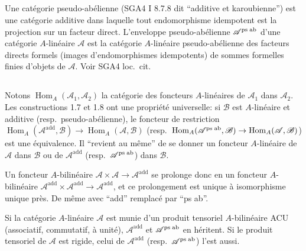 \documentclass[11pt,a4paper]{article}
\theoremstyle{plain}
\theoremstyle{definition}
\DeclareMathOperator{\Hom}{Hom}
\begin{document}
\subsection{}
Une cat\'egorie pseudo-ab\'elienne (SGA4 I 8.7.8 dit ``additive et karoubienne'') est une cat\'egorie additive dans laquelle tout endomorphisme idempotent est la projection sur un facteur direct. L'enveloppe pseudo-ab\'elienne $\mathcal{A}^{\text{ps\;ab}}$ d'une cat\'egorie $A$-lin\'eaire $\mathcal{A}$ est la cat\'egorie $A$-lin\'eaire pseudo-ab\'elienne des facteurs directs formels (images d'endomorphismes idempotents) de sommes formelles finies d'objets de $\mathcal{A}$. Voir SGA4 loc.~cit.

\subsection{}
Notons $\Hom_A(\mathcal{A}_1, \mathcal{A}_2)$ la cat\'egorie des foncteurs $A$-lin\'eaires de $\mathcal{A}_1$ dans $\mathcal{A}_2$. Les constructions 1.7 et 1.8 ont une propri\'et\'e universelle: si $\mathcal{B}$ est $A$-lin\'eaire et additive (resp.~pseudo-ab\'elienne), le foncteur de restriction $\Hom_A(\mathcal{A}^{\text{add}}, \mathcal{B}) \to \Hom_A(\mathcal{A}, \mathcal{B})$ (resp.~$\Hom_A(\mathcal{A}^{\text{ps\;ab}}, \mathcal{B}) \to \Hom_A(\mathcal{A}, \mathcal{B})$) est une \'equivalence. Il ``revient au m\^eme'' de se donner un foncteur $A$-lin\'eaire de $\mathcal{A}$ dans $\mathcal{B}$ ou de $\mathcal{A}^{\text{add}}$ (resp.~$\mathcal{A}^{\text{ps\;ab}}$) dans $\mathcal{B}$.

Un foncteur $A$-bilin\'eaire $\mathcal{A} \times \mathcal{A} \to \mathcal{A}^{\text{add}}$ se prolonge donc en un foncteur $A$-bilin\'eaire $\mathcal{A}^{\text{add}} \times \mathcal{A}^{\text{add}} \to \mathcal{A}^{\text{add}}$, et ce prolongement est unique \`a isomorphisme unique pr\`es. De m\^eme avec ``add'' remplac\'e par ``ps ab''.

Si la cat\'egorie $A$-lin\'eaire $\mathcal{A}$ est munie d'un produit tensoriel $A$-bilin\'eaire ACU (associatif, commutatif, \`a unit\'e), $\mathcal{A}^{\text{add}}$ et $\mathcal{A}^{\text{ps\;ab}}$ en h\'eritent. Si le produit tensoriel de $\mathcal{A}$ est rigide, celui de $\mathcal{A}^{\text{add}}$ (resp.~$\mathcal{A}^{\text{ps\;ab}}$) l'est aussi.
\end{document}
